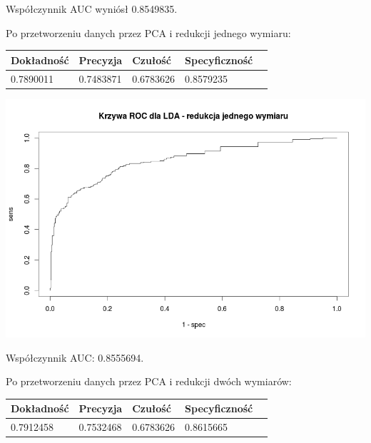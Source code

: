 \documentclass{article}
\begin{document}
Współczynnik AUC wyniósł 0.8549835.

Po przetworzeniu danych przez PCA i redukcji jednego wymiaru:

\begin{center}
    \begin{tabular}{| l | l | l | l | l|}
    \hline
        Dokładność &  Precyzja &  Czułość & Specyficzność \\ \hline
      	0.7890011 & 0.7483871 & 0.6783626 & 0.8579235  \\
    \hline
    \end{tabular}
\end{center}

\begin{center}
	\includegraphics[scale=0.40]{images/lda1.png}
\end{center}

Współczynnik AUC: 0.8555694.

Po przetworzeniu danych przez PCA i redukcji dwóch wymiarów:

\begin{center}
    \begin{tabular}{| l | l | l | l | l|}
    \hline
        Dokładność &  Precyzja &  Czułość & Specyficzność \\ \hline
      	0.7912458 & 0.7532468 & 0.6783626 & 0.8615665  \\
    \hline
    \end{tabular}
\end{center}
\end{document}
